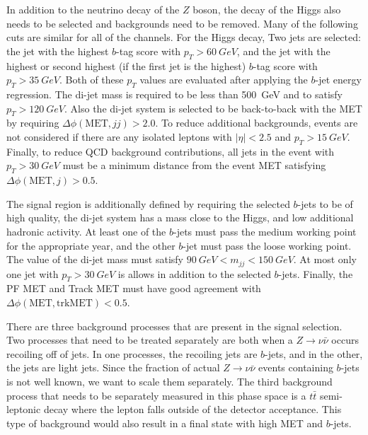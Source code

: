 In addition to the neutrino decay of the $Z$ boson,
the \bb decay of the Higgs also needs to be selected and backgrounds need to be removed.
Many of the following cuts are similar for all of the channels.
For the Higgs decay, Two jets are selected:
the jet with the highest $b$-tag score with $p_T > \SI{60}{GeV}$,
and the jet with the highest or second highest (if the first jet is the highest)
$b$-tag score with $p_T > \SI{35}{GeV}$.
Both of these $p_T$ values are evaluated after applying the $b$-jet energy regression.
The di-jet mass is required to be less than \SI{500}{GeV} and to satisfy $p_T > \SI{120}{GeV}$.
Also the di-jet system is selected to be back-to-back with the MET
by requiring $\Delta\phi(\mathrm{MET}, jj) > 2.0$.
To reduce additional backgrounds, events are not considered if there are any isolated leptons
with $|\eta| < 2.5$ and $p_T > \SI{15}{GeV}$.
Finally, to reduce QCD background contributions, all jets in the event with $p_T > \SI{30}{GeV}$
must be a minimum distance from the event MET satisfying $\Delta \phi(\mathrm{MET}, j) > 0.5$.


The signal region is additionally defined by requiring
the selected $b$-jets to be of high quality,
the di-jet system has a mass close to the Higgs,
and low additional hadronic activity.
At least one of the $b$-jets must pass the medium working point for the appropriate year,
and the other $b$-jet must pass the loose working point.
The value of the di-jet mass must satisfy $\SI{90}{GeV} < m_{jj} < \SI{150}{GeV}$.
At most only one jet with $p_T > \SI{30}{GeV}$ is allows in addition to the selected $b$-jets.
Finally, the PF MET and Track MET must have good agreement with
$\Delta \phi(\mathrm{MET}, \mathrm{trkMET}) < 0.5$.

There are three background processes that are present in the signal selection.
Two processes that need to be treated separately are both when a $Z \rightarrow \nu\bar{\nu}$
occurs recoiling off of jets.
In one processes, the recoiling jets are $b$-jets,
and in the other, the jets are light jets.
Since the fraction of actual $Z \rightarrow \nu\bar{\nu}$ events
containing $b$-jets is not well known, we want to scale them separately.
The third background process that needs to be separately measured in this phase space
is a $t\bar{t}$ semi-leptonic decay where the lepton falls outside of the detector acceptance.
This type of background would also result in a final state with high MET and $b$-jets.

